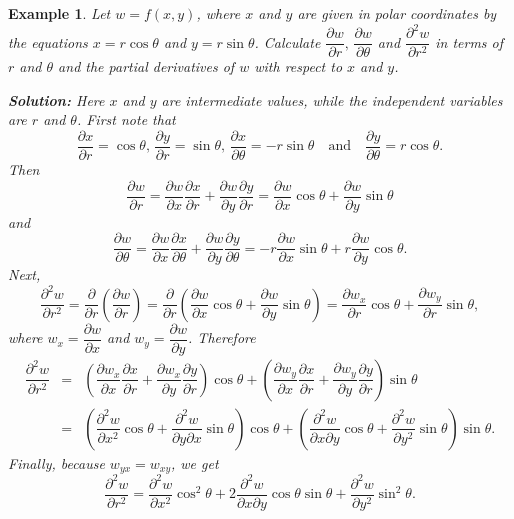 \documentclass[titlepage,a4paper,12pt]{report}
\newtheorem{example}{Example}[section]
\begin{document}
\begin{example}
Let $w=f(x,y)$, where $x$ and $y$ are given in polar coordinates by the equations $x=r\cos \theta$ and $y=r\sin \theta$. Calculate $\dfrac{\partial w}{\partial r}, \, \dfrac{\partial w}{\partial \theta}$ and $\dfrac{\partial ^2 w}{\partial r^2}$ in terms of $r$ and $\theta$ and the partial derivatives of $w$ with respect to $x$ and $y$.

\noindent \textbf{Solution:} Here $x$ and $y$ are intermediate values, while the independent variables are $r$ and $\theta$. First note that 
\[\dfrac{\partial x}{\partial r}=\cos \theta, \, \dfrac{\partial y}{\partial r}=\sin \theta, \, \dfrac{\partial x}{\partial \theta}=-r\sin \theta \quad \mbox{and} \quad \dfrac{\partial y}{\partial \theta}=r\cos \theta.\]
Then
\[\dfrac{\partial w}{\partial r}=\dfrac{\partial w}{\partial x}\dfrac{\partial x}{\partial r}+\dfrac{\partial w}{\partial y}\dfrac{\partial y}{\partial r}=\dfrac{\partial w}{\partial x}\cos \theta +\dfrac{\partial w}{\partial y}\sin \theta\] and 
\[\dfrac{\partial w}{\partial \theta}=\dfrac{\partial w}{\partial x}\dfrac{\partial x}{\partial \theta}+\dfrac{\partial w}{\partial y}\dfrac{\partial y}{\partial \theta}=-r\dfrac{\partial w}{\partial x}\sin \theta +r\dfrac{\partial w}{\partial y}\cos \theta.\]
Next, 
\[\dfrac{\partial ^2 w}{\partial r^2}=\dfrac{\partial}{\partial r}\left(\dfrac{\partial w}{\partial r}\right)=\dfrac{\partial}{\partial r}\left(\dfrac{\partial w}{\partial x}\cos \theta +\dfrac{\partial w}{\partial y}\sin \theta\right)=\dfrac{\partial w_x}{\partial r}\cos \theta +\dfrac{\partial w_y}{\partial r}\sin \theta, \] where $w_x=\dfrac{\partial w}{\partial x}$ and $w_y=\dfrac{\partial w}{\partial y}$. Therefore 
\begin{eqnarray*}
\dfrac{\partial ^2 w}{\partial r^2} &=& \left(\dfrac{\partial w_x}{\partial x}\dfrac{\partial x}{\partial r}+\dfrac{\partial w_x}{\partial y}\dfrac{\partial y}{\partial r}\right)\cos \theta +\left(\dfrac{\partial w_y}{\partial x}\dfrac{\partial x}{\partial r}+\dfrac{\partial w_y}{\partial y}\dfrac{\partial y}{\partial r}\right)\sin \theta\\
&=& \left(\dfrac{\partial ^2 w}{\partial x^2}\cos \theta +\dfrac{\partial ^2 w}{\partial y \partial x}\sin \theta\right)\cos \theta +\left(\dfrac{\partial ^2 w}{\partial x \partial y}\cos \theta +\dfrac{\partial ^2 w}{\partial y^2}\sin \theta\right)\sin \theta.
\end{eqnarray*}
Finally, because $w_{yx}=w_{xy}$, we get 
\[\dfrac{\partial ^2 w}{\partial r^2}=\dfrac{\partial ^2 w}{\partial x^2}\cos ^2 \theta +2\dfrac{\partial ^2 w}{\partial x \partial y}\cos \theta \sin \theta +\dfrac{\partial ^2 w}{\partial y^2}\sin ^2 \theta.\]
\end{example}
\end{document}

